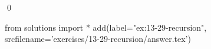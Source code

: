 
\begin{ex}
  \label{ex:13-29-recursion}
  
  \qed
\end{ex}
\begin{python0}
from solutions import *
add(label="ex:13-29-recursion",
    srcfilename='exercises/13-29-recursion/answer.tex')
\end{python0}
